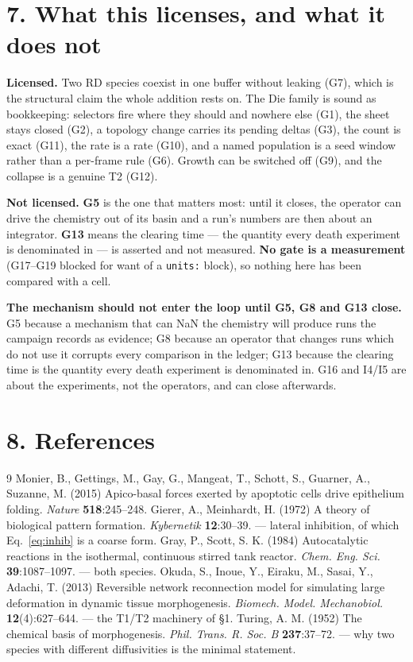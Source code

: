 \documentclass[10pt,a4paper]{article}
\newcommand{\code}[1]{\texttt{#1}}
\begin{document}
\section*{7.\; What this licenses, and what it does not}

\textbf{Licensed.} Two RD species coexist in one buffer without leaking (G7), which is the structural
claim the whole addition rests on. The Die family is sound as bookkeeping: selectors fire where they
should and nowhere else (G1), the sheet stays closed (G2), a topology change carries its pending
deltas (G3), the count is exact (G11), the rate is a rate (G10), and a named population is a seed
window rather than a per-frame rule (G6). Growth can be switched off (G9), and the collapse is a
genuine T2 (G12).

\textbf{Not licensed.} \textbf{G5} is the one that matters most: until it closes, the operator can
drive the chemistry out of its basin and a run's numbers are then about an integrator.
\textbf{G13} means the clearing time --- the quantity every death experiment is denominated in ---
is asserted and not measured. \textbf{No gate is a measurement} (G17--G19 blocked for want of a
\code{units:} block), so nothing here has been compared with a cell.

\textbf{The mechanism should not enter the loop until G5, G8 and G13 close.} G5 because a mechanism
that can NaN the chemistry will produce runs the campaign records as evidence; G8 because an
operator that changes runs which do not use it corrupts every comparison in the ledger; G13 because
the clearing time is the quantity every death experiment is denominated in. G16 and I4/I5 are about
the experiments, not the operators, and can close afterwards.

\section*{8.\; References}

{\small
\begin{thebibliography}{9}\setlength{\itemsep}{0pt}
 Monier, B., Gettings, M., Gay, G., Mangeat, T., Schott, S., Guarner, A.,
Suzanne, M. (2015) Apico-basal forces exerted by apoptotic cells drive epithelium folding.
\emph{Nature} \textbf{518}:245--248.
 Gierer, A., Meinhardt, H. (1972) A theory of biological pattern formation.
\emph{Kybernetik} \textbf{12}:30--39. --- lateral inhibition, of which Eq.~\eqref{eq:inhib} is a
coarse form.
 Gray, P., Scott, S. K. (1984) Autocatalytic reactions in the isothermal,
continuous stirred tank reactor. \emph{Chem. Eng. Sci.} \textbf{39}:1087--1097. --- both species.
 Okuda, S., Inoue, Y., Eiraku, M., Sasai, Y., Adachi, T. (2013) Reversible
network reconnection model for simulating large deformation in dynamic tissue morphogenesis.
\emph{Biomech. Model. Mechanobiol.} \textbf{12}(4):627--644. --- the T1/T2 machinery of \S1.
 Turing, A. M. (1952) The chemical basis of morphogenesis.
\emph{Phil. Trans. R. Soc. B} \textbf{237}:37--72. --- why two species with different
diffusivities is the minimal statement.
\end{thebibliography}}
\end{document}
